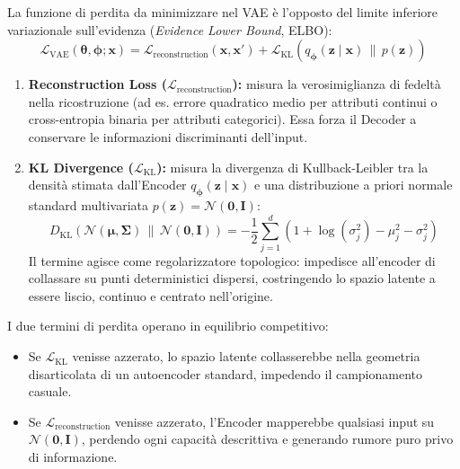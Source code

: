 \begin{definition}
La funzione di perdita da minimizzare nel VAE è l'opposto del limite inferiore variazionale sull'evidenza (\textit{Evidence Lower Bound}, ELBO):
\begin{equation}
    \mathcal{L}_{\text{VAE}}(\boldsymbol{\theta}, \boldsymbol{\phi}; \mathbf{x}) = \mathcal{L}_{\text{reconstruction}}(\mathbf{x}, \mathbf{x}') + \mathcal{L}_{\text{KL}}(q_{\boldsymbol{\phi}}(\mathbf{z} \mid \mathbf{x}) \,\|\, p(\mathbf{z}))
\end{equation}
\begin{enumerate}
    \item \textbf{Reconstruction Loss ($\mathcal{L}_{\text{reconstruction}}$):} misura la verosimiglianza di fedeltà nella ricostruzione (ad es. errore quadratico medio per attributi continui o cross-entropia binaria per attributi categorici). Essa forza il Decoder a conservare le informazioni discriminanti dell'input.
    \item \textbf{KL Divergence ($\mathcal{L}_{\text{KL}}$):} misura la divergenza di Kullback-Leibler tra la densità stimata dall'Encoder $q_{\boldsymbol{\phi}}(\mathbf{z} \mid \mathbf{x})$ e una distribuzione a priori normale standard multivariata $p(\mathbf{z}) = \mathcal{N}(\mathbf{0}, \mathbf{I})$:
    \begin{equation}
        D_{\text{KL}}\left(\mathcal{N}(\boldsymbol{\mu}, \boldsymbol{\Sigma}) \,\|\, \mathcal{N}(\mathbf{0}, \mathbf{I})\right) = -\frac{1}{2} \sum_{j=1}^d \left( 1 + \log(\sigma_j^2) - \mu_j^2 - \sigma_j^2 \right)
    \end{equation}
    Il termine agisce come regolarizzatore topologico: impedisce all'encoder di collassare su punti deterministici dispersi, costringendo lo spazio latente a essere liscio, continuo e centrato nell'origine.
\end{enumerate}
\end{definition}

\begin{theorem}
I due termini di perdita operano in equilibrio competitivo:
\begin{itemize}
    \item Se $\mathcal{L}_{\text{KL}}$ venisse azzerato, lo spazio latente collasserebbe nella geometria disarticolata di un autoencoder standard, impedendo il campionamento casuale.
    \item Se $\mathcal{L}_{\text{reconstruction}}$ venisse azzerato, l'Encoder mapperebbe qualsiasi input su $\mathcal{N}(\mathbf{0}, \mathbf{I})$, perdendo ogni capacità descrittiva e generando rumore puro privo di informazione.
\end{itemize}
\end{theorem}

